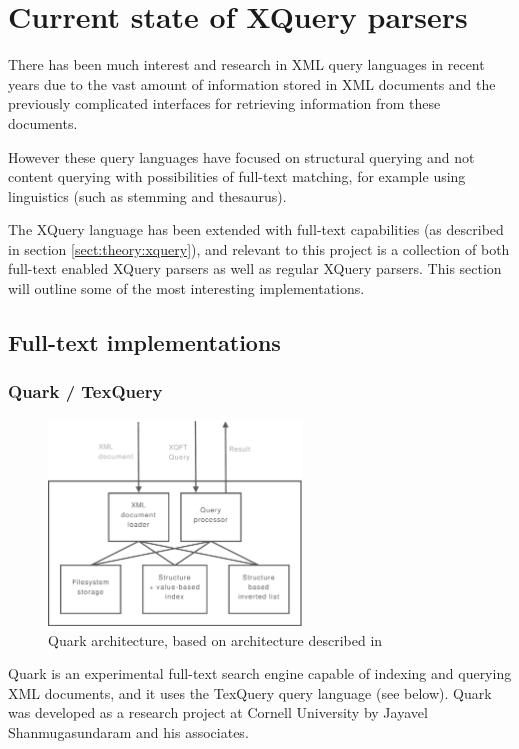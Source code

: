 \section{Current state of XQuery parsers}

There has been much interest and research in XML query languages in recent
years due to the vast amount of information stored in XML documents and the
previously complicated interfaces for retrieving information from these documents.

However these query languages have focused on structural querying and not
content querying with possibilities of full-text matching, for example using
linguistics (such as stemming and thesaurus).

The XQuery language has been extended with full-text capabilities (as described
in section \ref{sect:theory:xquery}), and relevant to this project is a
collection of both full-text enabled XQuery parsers as well as regular XQuery
parsers. This section will outline some of the most interesting implementations.

\subsection{Full-text implementations}
\subsubsection{Quark / TexQuery}
\begin{figure}[!h]
  \centering
    \includegraphics[width=0.6\textwidth]{diagrams/quark_arch}
  \caption{Quark architecture, based on architecture described in
  \cite{quark_efficientxquery}}
\end{figure}

Quark is an experimental full-text search engine capable of indexing and
querying XML documents, and it uses the TexQuery query language (see below). 
Quark was developed as a research project at Cornell University by Jayavel 
Shanmugasundaram and his associates.

